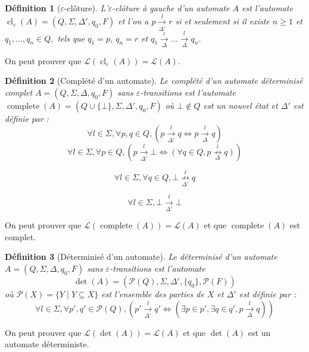 \documentclass[conference]{IEEEtran}
\newtheorem{mydef}{D\'efinition}
\begin{document}
\begin{mydef}[$\varepsilon$-clôture]
L'$\varepsilon$-clôture \`a gauche  d'un automate $A$ est l'automate $\operatorname{cl}_\varepsilon(A) = (Q, \Sigma, \Delta', q_0, F)$ et l'on a $p \underset{\Delta'}{\overset{l}{{\to}}} r$ si et seulement si il existe $n\ge 1$ et $q_1,\dots,q_n \in Q,$ tels que $q_1 = p$, $q_n = r$ et $q_1 \underset{\Delta}{\overset{\varepsilon}{{\to}}} \dots \underset{\Delta}{\overset{l}{{\to}}} q_n$.
\end{mydef}
On peut prouver que $\mathcal L(\operatorname{cl}_\varepsilon(A))=\mathcal L(A)$.

\begin{mydef}[Compl\'et\'e d'un automate]
Le compl\'et\'e d'un automate déterminisé complet $A = (Q, \Sigma, \Delta, q_0, F)$ sans $\varepsilon$-transitions est l'automate $\operatorname{complete}(A) = (Q\cup\{\bot\}, \Sigma, \Delta', q_0, F)$ o\`u $\bot\not\in Q$ est un nouvel \'etat et $\Delta'$ est d\'efinie par :
$$\forall l \in \Sigma,\forall p,q \in Q, \left(p\underset{\Delta'}{\overset{l}{{\to}}}q \iff p\underset{\Delta}{\overset{l}{{\to}}}q\right)$$
$$\forall l \in \Sigma, \forall p \in Q, \left(p\underset{\Delta'}{\overset{l}{{\to}}}\bot \iff \left(\forall q \in Q, p\underset{\Delta}{\overset{l}{{\not\to}}}q\right)\right)$$

$$\forall l \in \Sigma, \forall q \in Q,\bot\underset{\Delta'}{\overset{l}{{\not\to}}}q$$

$$\forall l \in \Sigma, \bot\underset{\Delta'}{\overset{l}{{\to}}}\bot$$
\end{mydef}

On peut prouver que $\mathcal L(\operatorname{complete}(A)) = \mathcal L(A)$ et que $\operatorname{complete}(A)$ est complet.

\begin{mydef}[D\'eterminis\'e d'un automate]
Le d\'eterminis\'e d'un automate $A = (Q, \Sigma, \Delta, q_0, F)$ sans $\varepsilon$-transitions est l'automate $$\det(A) = (\mathcal P(Q), \Sigma, \Delta', \{q_0\}, \mathcal P(F))$$ o\`u $\mathcal P(X)=\{Y\mid Y \subseteq X\}$ est l'ensemble des parties de $X$ et $\Delta'$ est d\'efinie par :
$$\forall l \in \Sigma,\forall p',q' \in \mathcal P(Q), \left(p'\underset{\Delta'}{\overset{l}{{\to}}}q' \iff \left( \exists p \in p', \exists q \in q', p\underset{\Delta}{\overset{l}{{\to}}}q\right)\right)$$
\end{mydef}

On peut prouver que $\mathcal L(\det(A))=\mathcal L(A)$ et que $\det(A)$ est un automate d\'eterministe.
\end{document}
